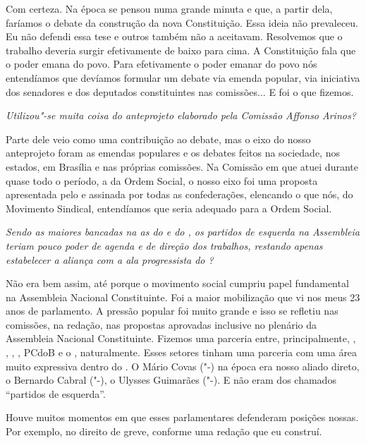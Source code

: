 Com certeza. Na época se pensou numa grande minuta e que,
a partir dela, faríamos o debate da construção da nova Constituição.
Essa ideia não prevaleceu. Eu não defendi essa tese e outros também não
a aceitavam. Resolvemos que o trabalho deveria surgir efetivamente de
baixo para cima. A Constituição fala que o poder emana do povo. Para
efetivamente o poder emanar do povo nós entendíamos que devíamos
formular um debate via emenda popular, via iniciativa dos senadores e
dos deputados constituintes nas comissões... E foi o que fizemos.

\medskip

\noindent\emph{Utilizou"-se muita coisa do anteprojeto elaborado pela Comissão
Affonso Arinos?}

Parte dele veio como uma contribuição ao debate, mas o
eixo do nosso anteprojeto foram as emendas populares e os debates feitos
na sociedade, nos estados, em Brasília e nas próprias comissões. Na
Comissão em que atuei durante quase todo o período, a da Ordem Social, o
nosso eixo foi uma proposta apresentada pelo  e assinada por todas
as confederações, elencando o que nós, do Movimento Sindical,
entendíamos que seria adequado para a Ordem Social.

\medskip

\noindent\emph{Sendo as maiores bancadas na  as do  e do , os
partidos de esquerda na Assembleia teriam pouco poder de agenda e de
direção dos trabalhos, restando apenas estabelecer a aliança com a ala
progressista do ? }

Não era bem assim, até porque o movimento social cumpriu
papel fundamental na Assembleia Nacional Constituinte. Foi a maior
mobilização que vi nos meus 23 anos de parlamento. A pressão popular foi
muito grande e isso se refletiu nas comissões, na redação, nas propostas
aprovadas inclusive no plenário da Assembleia Nacional Constituinte.
Fizemos uma parceria entre, principalmente, ,
, , , PCdoB e
o , naturalmente. Esses setores tinham uma parceria com uma área muito
expressiva dentro do . O Mário Covas ("-) na época era nosso
aliado direto, o Bernardo Cabral ("-), o Ulysses Guimarães
("-). E não eram dos chamados ``partidos de esquerda''.

Houve muitos momentos em que esses parlamentares defenderam posições
nossas. Por exemplo, no direito de greve, conforme uma redação que eu
construí.

